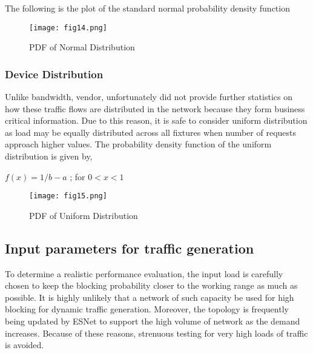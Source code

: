 The following is the plot of the standard normal probability density function \\
\begin{figure}[H]
\centering
\texttt{[image: fig14.png]}
\caption{PDF of Normal Distribution}
\label{fig:normalPDF}
\end{figure}
 
\subsubsection {Device Distribution}
Unlike bandwidth, vendor, unfortunately did not provide further statistics on how these traffic flows are distributed in the network because they form business critical information. Due to this reason, it is safe to consider uniform distribution as load may be equally distributed across all fixtures when number of requests approach higher values.
The probability density function of the uniform distribution is given by,
 
$f(x)=1/b-a$ ; for $0< x< 1$

\begin{figure}[H]
\centering
\texttt{[image: fig15.png]}
\caption{PDF of Uniform Distribution}
\label{fig:unifirmPDF}
\end{figure}

\subsection {Input parameters for traffic generation}
To determine a realistic performance evaluation, the input load is carefully chosen to keep the blocking probability closer to the working range as much as possible. It is highly unlikely that a network of such capacity be used for high blocking for dynamic traffic generation. Moreover, the topology is frequently being updated by ESNet to support the high volume of network as the demand increases. Because of these reasons, strenuous testing for very high loads of traffic is avoided. 

